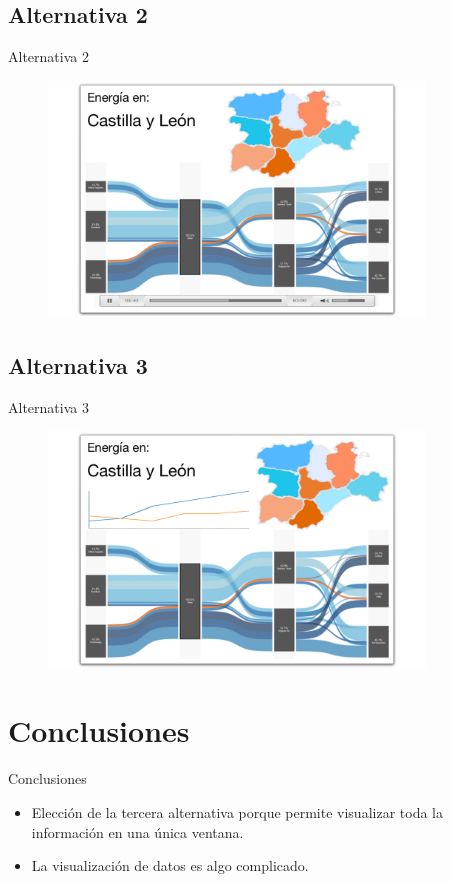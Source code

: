 \documentclass{beamer}
\begin{document}
		\subsection{Alternativa 2}
		
			\begin{frame}{Alternativa 2}
				\begin{figure}[H]
					\centering
					\includegraphics[width=100mm]{../res/design4.png}
				\end{figure}
			\end{frame}
		
		\subsection{Alternativa 3}

			\begin{frame}{Alternativa 3}
				\begin{figure}[H]
					\centering
					\includegraphics[width=100mm]{../res/design5.png}
				\end{figure}
			\end{frame}
		
	\section{Conclusiones}
	
		\begin{frame}{Conclusiones}
		
			\begin{itemize}
			
				\item Elección de la tercera alternativa porque permite visualizar toda la información en una única ventana.
				\item La visualización de datos es algo complicado.
			\end{itemize}
		
		\end{frame}
\end{document}
